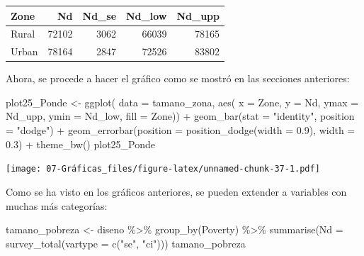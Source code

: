 \documentclass[
  12pt,
]{book}
\newenvironment{Shaded}{\begin{snugshade}}{\end{snugshade}}
\newcommand{\AttributeTok}[1]{\textcolor[rgb]{0.77,0.63,0.00}{#1}}
\newcommand{\FloatTok}[1]{\textcolor[rgb]{0.00,0.00,0.81}{#1}}
\newcommand{\FunctionTok}[1]{\textcolor[rgb]{0.00,0.00,0.00}{#1}}
\newcommand{\NormalTok}[1]{#1}
\newcommand{\OtherTok}[1]{\textcolor[rgb]{0.56,0.35,0.01}{#1}}
\newcommand{\SpecialCharTok}[1]{\textcolor[rgb]{0.00,0.00,0.00}{#1}}
\newcommand{\StringTok}[1]{\textcolor[rgb]{0.31,0.60,0.02}{#1}}
\begin{document}
\begin{tabular}{l|r|r|r|r}
\hline
Zone & Nd & Nd\_se & Nd\_low & Nd\_upp\\
\hline
Rural & 72102 & 3062 & 66039 & 78165\\
\hline
Urban & 78164 & 2847 & 72526 & 83802\\
\hline
\end{tabular}

Ahora, se procede a hacer el gráfico como se mostró en las secciones anteriores:

\begin{Shaded}
\begin{Highlighting}[]
\NormalTok{plot25\_Ponde }\OtherTok{\textless{}{-}} \FunctionTok{ggplot}\NormalTok{(}
  \AttributeTok{data =}\NormalTok{ tamano\_zona, }
  \FunctionTok{aes}\NormalTok{(}
    \AttributeTok{x =}\NormalTok{ Zone,         }
    \AttributeTok{y =}\NormalTok{ Nd,           }
    \AttributeTok{ymax =}\NormalTok{ Nd\_upp,    }
    \AttributeTok{ymin =}\NormalTok{ Nd\_low,    }
    \AttributeTok{fill =}\NormalTok{ Zone)) }\SpecialCharTok{+}
  \FunctionTok{geom\_bar}\NormalTok{(}\AttributeTok{stat =} \StringTok{"identity"}\NormalTok{, }\AttributeTok{position =} \StringTok{"dodge"}\NormalTok{) }\SpecialCharTok{+}
  \FunctionTok{geom\_errorbar}\NormalTok{(}\AttributeTok{position =} \FunctionTok{position\_dodge}\NormalTok{(}\AttributeTok{width =} \FloatTok{0.9}\NormalTok{),}
    \AttributeTok{width =} \FloatTok{0.3}\NormalTok{) }\SpecialCharTok{+}
  \FunctionTok{theme\_bw}\NormalTok{()}
\NormalTok{plot25\_Ponde}
\end{Highlighting}
\end{Shaded}

\texttt{[image: 07-Gráficas\_files/figure-latex/unnamed-chunk-37-1.pdf]}

Como se ha visto en los gráficos anteriores, se pueden extender a variables con muchas más categorías:

\begin{Shaded}
\begin{Highlighting}[]
\NormalTok{tamano\_pobreza }\OtherTok{\textless{}{-}}\NormalTok{ diseno }\SpecialCharTok{\%\textgreater{}\%}
  \FunctionTok{group\_by}\NormalTok{(Poverty) }\SpecialCharTok{\%\textgreater{}\%}
  \FunctionTok{summarise}\NormalTok{(}\AttributeTok{Nd =} \FunctionTok{survey\_total}\NormalTok{(}\AttributeTok{vartype =} \FunctionTok{c}\NormalTok{(}\StringTok{"se"}\NormalTok{, }\StringTok{"ci"}\NormalTok{)))}
\NormalTok{tamano\_pobreza}
\end{Highlighting}
\end{Shaded}
\end{document}
